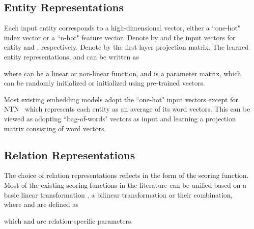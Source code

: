 \documentclass{article} \usepackage{iclr2015,times}
\begin{document}
\subsection{Entity Representations}
Each input entity corresponds to a high-dimensional vector, either a ``one-hot" index vector or a ``n-hot" feature vector. Denote by  and  the input vectors for entity  and , respectively. Denote by  the first layer projection matrix. The learned entity representations,  and  can be written as

where  can be a linear or non-linear function, and  is a parameter matrix, which can be randomly initialized or initialized using pre-trained vectors. 

Most existing embedding models adopt the ``one-hot" input vectors except for NTN~\citep{SocherChenManningNg2013} which represents each entity as an average of its word vectors. This can be viewed as adopting ``bag-of-words" vectors as input and learning a projection matrix consisting of word vectors. 
\subsection{Relation Representations}
The choice of relation representations reflects in the form of the scoring function. Most of the existing scoring functions in the literature can be unified based on a basic linear transformation , a bilinear transformation  or their combination, where  and  are defined as

which  and  are relation-specific parameters.

\begin{table*}[bth]
\begin{center}
\begin{footnotesize}
\end{footnotesize}
\caption{\label{summary} Comparisons among several multi-relational models in their scoring functions. }
\end{center}
\end{table*}
\end{document}
